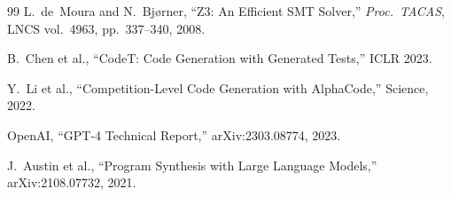 \documentclass[11pt]{article}
\begin{document}
\begin{thebibliography}{99}
L.~de~Moura and N.~Bj{\o}rner,
``Z3: An Efficient SMT Solver,''
\emph{Proc.\ TACAS}, LNCS vol.~4963, pp.~337--340, 2008.

B.~Chen et al.,
``CodeT: Code Generation with Generated Tests,''
ICLR 2023.

Y.~Li et al.,
``Competition-Level Code Generation with AlphaCode,''
Science, 2022.

OpenAI, ``GPT-4 Technical Report,'' arXiv:2303.08774, 2023.

J.~Austin et al., ``Program Synthesis with Large Language Models,''
arXiv:2108.07732, 2021.

\end{thebibliography}
\end{document}
